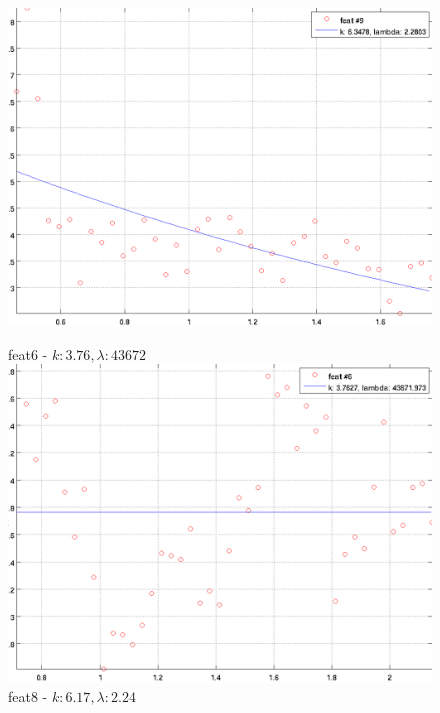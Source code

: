 \documentclass[12pt]{report}
\begin{document}
\begin{figure}[H]
\begin{minipage}[t]{0.5\linewidth}
	\includegraphics[scale=\imFeat]{images/feat9}\\
\end{minipage}
\begin{minipage}[t]{0.5\linewidth}
	\centering
	feat6 - $k: 3.76, \lambda: 43672 $\\
	\includegraphics[scale=\imFeat]{images/feat6}\\
	feat8 - $k: 6.17, \lambda: 2.24 $\\

\end{minipage}
\end{figure}
\end{document}
